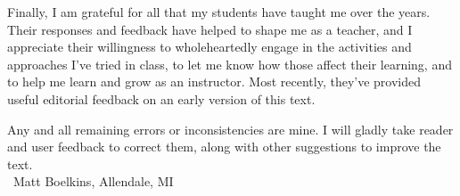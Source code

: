 Finally, I am grateful for all that my students have taught me over the years.  Their responses and feedback have helped to shape me as a teacher, and I appreciate their willingness to wholeheartedly engage in the activities and approaches I've tried in class, to let me know how those affect their learning, and to help me learn and grow as an instructor.  Most recently, they've provided useful editorial feedback on an early version of this text. 

Any and all remaining errors or inconsistencies are mine.  I will gladly take reader and user feedback to correct them, along with other suggestions to improve the text. \\

\ \hfill Matt Boelkins, Allendale, MI
 
